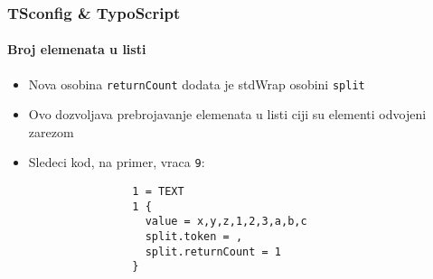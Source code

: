 \begin{frame}[fragile]
	\frametitle{TSconfig \& TypoScript}
	\framesubtitle{Broj elemenata u listi}

	\lstset{basicstyle=\tiny\ttfamily}

	\begin{itemize}

		\item Nova osobina \texttt{returnCount} dodata je stdWrap osobini \texttt{split}

		\item Ovo dozvoljava prebrojavanje elemenata u listi ciji su elementi odvojeni zarezom

		\item Sledeci kod, na primer, vraca \texttt{9}:

			\begin{lstlisting}
				1 = TEXT
				1 {
				  value = x,y,z,1,2,3,a,b,c
				  split.token = ,
				  split.returnCount = 1
				}
			\end{lstlisting}

	\end{itemize}

\end{frame}

